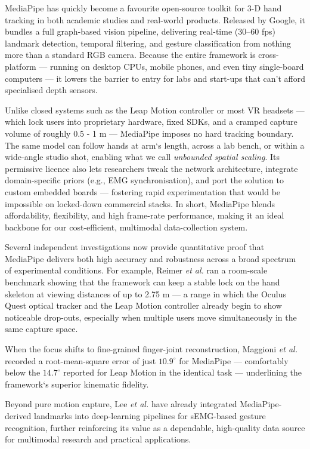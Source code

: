 MediaPipe has quickly become a favourite open-source toolkit for 3-D hand tracking in both academic studies and real-world products. Released by Google, it bundles a full graph-based vision pipeline, delivering real-time (30–60 fps) landmark detection, temporal filtering, and gesture classification from nothing more than a standard RGB camera. Because the entire framework is cross-platform — running on desktop CPUs, mobile phones, and even tiny single-board computers — it lowers the barrier to entry for labs and start-ups that can’t afford specialised depth sensors.

Unlike closed systems such as the Leap Motion controller or most VR headsets — which lock users into proprietary hardware, fixed SDKs, and a cramped capture volume of roughly 0.5 - 1 m — MediaPipe imposes no hard tracking boundary. The same model can follow hands at arm`s length, across a lab bench, or within a wide-angle studio shot, enabling what we call \textit{unbounded spatial scaling}. Its permissive licence also lets researchers tweak the network architecture, integrate domain-specific priors (e.g., EMG synchronisation), and port the solution to custom embedded boards — fostering rapid experimentation that would be impossible on locked-down commercial stacks. In short, MediaPipe blends affordability, flexibility, and high frame-rate performance, making it an ideal backbone for our cost-efficient, multimodal data-collection system.

Several independent investigations now provide quantitative proof that MediaPipe delivers both high accuracy and robustness across a broad spectrum of experimental conditions. For example, Reimer \textit{et al.} \cite{reimer2023evaluation} ran a room-scale benchmark showing that the framework can keep a stable lock on the hand skeleton at viewing distances of up to 2.75 m — a range in which the Oculus Quest optical tracker and the Leap Motion controller already begin to show noticeable drop-outs, especially when multiple users move simultaneously in the same capture space.  

When the focus shifts to fine-grained finger-joint reconstruction, Maggioni \textit{et al.} \cite{maggioni2025optimisation} recorded a root-mean-square error of just \(10.9^{\circ}\) for MediaPipe — comfortably below the \(14.7^{\circ}\) reported for Leap Motion in the identical task — underlining the framework`s superior kinematic fidelity.  

Beyond pure motion capture, Lee \textit{et al.} \cite{lee2022explainable} have already integrated MediaPipe-derived landmarks into deep-learning pipelines for sEMG-based gesture recognition, further reinforcing its value as a dependable, high-quality data source for multimodal research and practical applications.

